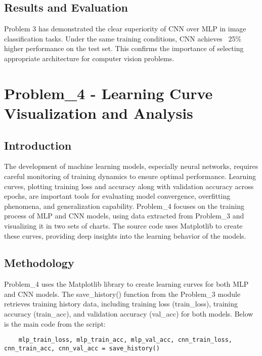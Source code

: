 \documentclass[12pt]{article}
\begin{document}
\subsection{Results and Evaluation}

Problem 3 has demonstrated the clear superiority of CNN over MLP in image 
classification tasks. Under the same training conditions, CNN achieves ~25\% higher 
performance on the test set. This confirms the importance of selecting appropriate 
architecture for computer vision problems.

\section{Problem\_4 - Learning Curve Visualization and Analysis}

\subsection{Introduction}

The development of machine learning models, especially neural networks, requires 
careful monitoring of training dynamics to ensure optimal performance. Learning 
curves, plotting training loss and accuracy along with validation accuracy across 
epochs, are important tools for evaluating model convergence, overfitting phenomena, 
and generalization capability. Problem\_4 focuses on the training process of MLP 
and CNN models, using data extracted from Problem\_3 and visualizing it in two sets 
of charts. The source code uses Matplotlib to create these curves, providing deep 
insights into the learning behavior of the models.

\subsection{Methodology}

Problem\_4 uses the Matplotlib library to create learning curves for both MLP and 
CNN models. The save\_history() function from the Problem\_3 module retrieves 
training history data, including training loss (train\_loss), training accuracy 
(train\_acc), and validation accuracy (val\_acc) for both models. Below is the main 
code from the script:

\begin{verbatim}
    mlp_train_loss, mlp_train_acc, mlp_val_acc, cnn_train_loss, cnn_train_acc, cnn_val_acc = save_history()
\end{verbatim}
\end{document}
